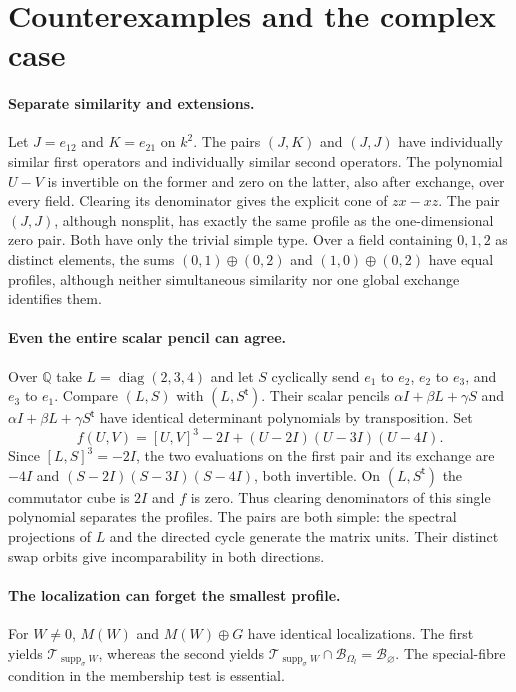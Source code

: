 \documentclass[11pt]{article}
\newcommand{\supp}{\operatorname{supp}_{\sigma}}
\newcommand{\bb}{\mathcal B}
\newcommand{\ttt}{\mathcal T}
\begin{document}
\section{Counterexamples and the complex case}\label{atoms}
\paragraph{Separate similarity and extensions.}
Let $J=e_{12}$ and $K=e_{21}$ on $k^2$. The pairs $(J,K)$ and $(J,J)$
have individually similar first operators and individually similar
second operators. The polynomial $U-V$ is invertible on the former
and zero on the latter, also after exchange, over every field.
Clearing its denominator gives the explicit cone of $zx-xz$.
The pair $(J,J)$, although nonsplit, has exactly the same profile as
the one-dimensional zero pair. Both have only the trivial simple type.
Over a field containing $0,1,2$ as distinct elements, the sums
$(0,1)\oplus(0,2)$ and $(1,0)\oplus(0,2)$ have equal profiles, although
neither simultaneous similarity nor one global exchange identifies them.

\paragraph{Even the entire scalar pencil can agree.}
Over $\mathbb Q$ take $L=\operatorname{diag}(2,3,4)$ and let $S$ cyclically
send $e_1$ to $e_2$, $e_2$ to $e_3$, and $e_3$ to $e_1$. Compare
$(L,S)$ with $(L,S^{\mathsf t})$. Their scalar pencils
$\alpha I+\beta L+\gamma S$ and $\alpha I+\beta L+\gamma S^{\mathsf t}$
have identical determinant polynomials by transposition. Set
\[
 f(U,V)=[U,V]^3-2I+(U-2I)(U-3I)(U-4I).
\]
Since $[L,S]^3=-2I$, the two evaluations on the first pair and its
exchange are $-4I$ and $(S-2I)(S-3I)(S-4I)$, both invertible.
On $(L,S^{\mathsf t})$ the commutator cube is $2I$ and $f$ is zero.
Thus clearing denominators of this single polynomial separates the
profiles. The pairs are both simple: the spectral projections of $L$
and the directed cycle generate the matrix units. Their distinct swap
orbits give incomparability in both directions.

\paragraph{The localization can forget the smallest profile.}
For $W\ne0$, $M(W)$ and $M(W)\oplus G$ have identical localizations.
The first yields $\ttt_{\supp W}$, whereas the second yields
$\ttt_{\supp W}\cap\bb_{\Omega_l}=\bb_\varnothing$.
The special-fibre condition in the membership test is essential.
\end{document}
